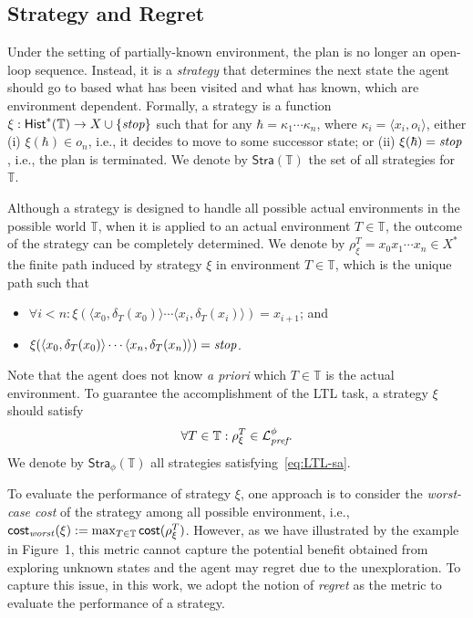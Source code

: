 \documentclass{ifacconf}
\def \L{\mathcal{L}}
\def \<{\langle}
\def \>{\rangle}
\def \pref{\emph{\text{pref}}}
\def \stop{\emph{\text{stop}}}
\def \stra{\textsf{Stra}}
\def \hist{\textsf{Hist}}
\def \cost{\textsf{cost}}
\def \T{\mathbb{T}}
\begin{document}
\subsection{Strategy and Regret}
%
Under the setting of partially-known environment, the plan is no longer an open-loop sequence. Instead, it is a \emph{strategy} that determines the next state the agent should go to based what has been visited and what has known, which are environment dependent. Formally, a strategy is a function
$\xi:\hist^*(\T)\to X\cup \{\stop\}$
such that  
for any $\hbar= \kappa_1 \cdots \kappa_n$,  where $\kappa_i=\<x_i,o_i\>$, 
either 
(i)  $\xi(\hbar)\in o_n$, i.e., it decides to move to some successor state;  or (ii) $\xi(\hbar)=\stop$, i.e., the plan is terminated.  
We denote by $\stra(\T)$ the set of all strategies for $\T$.

Although a strategy is designed to handle all possible actual environments in the possible world $\T$, when it is applied to an actual environment $T\in \T$, the outcome of the strategy can be completely determined. 
We denote by 
$\rho^{T}_\xi\!=\!x_0x_1\cdots x_n\!\in\! X^*$
the finite path induced by strategy $\xi$ in environment $T\in \T$, which is the unique path such that 
\begin{itemize}
    \item 
     $\forall i< n:\xi( \<x_0,\delta_T(x_0)\>\cdots    \<x_i,\delta_T(x_i)\>    )=x_{i+1}$; 
    and 
    \item
    $\xi( \<x_0,\delta_T(x_0)\>\cdots    \<x_n,\delta_T(x_n)\>    )=\stop$.
\end{itemize}
Note that the agent does not know \emph{a priori} which $T\in \T$ is the actual environment. 
To guarantee the accomplishment of the LTL task, a strategy $\xi$ should satisfy  
\begin{equation}\label{eq:LTL-sa}
\forall T\in \T:  \rho^{T}_\xi\in \L_{\pref}^\phi. 
\end{equation}
We denote by $\stra_\phi(\T)$   all strategies satisfying~\eqref{eq:LTL-sa}.

To evaluate the performance of strategy $\xi$, one approach is to consider the \emph{worst-case cost} of the strategy among all possible environment, i.e., $\textsf{cost}_{\text{\emph{worst}}}(\xi):=\max_{T\in \mathbb{T}}\cost(\rho^T_\xi)$.
However, as we have illustrated by the example in Figure~1, this metric cannot capture the potential benefit obtained from exploring unknown states and the agent may regret due to the unexploration.  To capture this issue, in this work, we adopt the notion of \emph{regret} as the metric to evaluate the performance of a strategy.  
\end{document}
